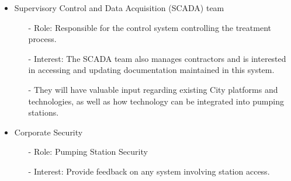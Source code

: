 \documentclass[12pt]{article}
\begin{document}
\begin{itemize}
    \item Supervisory Control and Data Acquisition (SCADA) team
    \begin{itemize}
        \item[-] Role: Responsible for the control system controlling
        the treatment process.
        \item[-] Interest: The SCADA team also manages contractors and is 
        interested in accessing and updating documentation maintained 
        in this system. 
        \item[-] They will have valuable input regarding existing City 
        platforms and technologies, as well as how technology can be 
        integrated into pumping stations.
    \end{itemize}
    \item Corporate Security

    \begin{itemize}
        \item[-] Role: Pumping Station Security
        \item[-] Interest: Provide feedback on any system involving station 
        access.
    \end{itemize}
\end{itemize}
\end{document}
